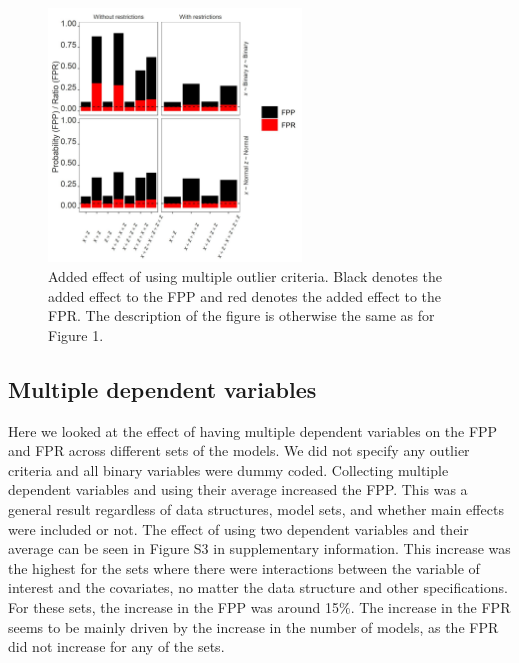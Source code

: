 \begin{figure}[t]
\includegraphics[width=0.6\textwidth]{R/Analysis/Result/Figures/Figure1B.jpeg}
\centering
\caption{Added effect of using multiple outlier criteria. Black denotes the added effect to the FPP and red denotes the added effect to the FPR.  The description of the figure is otherwise the same as for Figure 1.}
\label{fig:mainfigure}
\end{figure}

\subsection{Multiple dependent variables}
Here we looked at the effect of having multiple dependent variables on the FPP and FPR across different sets of the models. We did not specify any outlier criteria and all binary variables were dummy coded. Collecting multiple dependent variables and using their average increased the FPP. This was a general result regardless of data structures, model sets, and whether main effects were included or not. The effect of using two dependent variables and their average can be seen in Figure S3 in supplementary information. This increase was the highest for the sets where there were interactions between the variable of interest and the covariates, no matter the data structure and other specifications. For these sets, the increase in the FPP was around 15\%. The increase in the FPR seems to be mainly driven by the increase in the number of models, as the FPR did not increase for any of the sets. 

